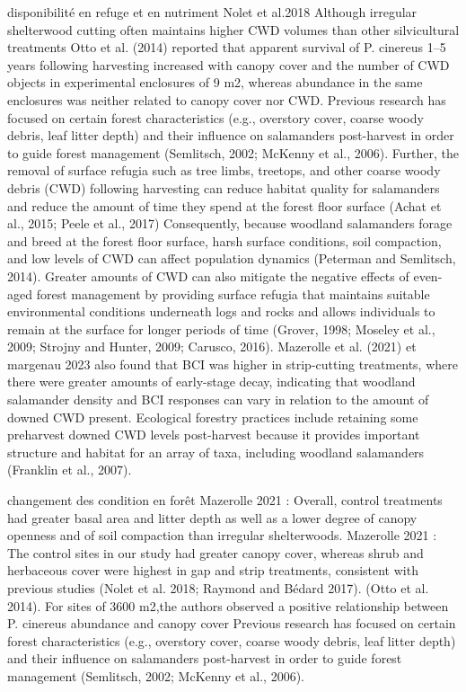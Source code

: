 disponibilité en refuge et en nutriment
Nolet et al.2018 Although irregular shelterwood cutting often maintains higher CWD volumes than other silvicultural treatments 
Otto et al. (2014) reported that apparent survival of P. cinereus 1–5 years following harvesting increased with canopy cover and the number of CWD objects in experimental enclosures of 9 m2, whereas abundance in the same enclosures was neither related to canopy cover nor CWD. 
Previous research has focused on certain forest characteristics (e.g., overstory cover, coarse woody debris, leaf litter depth) and their influence on salamanders post-harvest in order to guide forest management (Semlitsch, 2002; McKenny et al., 2006).
Further, the removal of surface refugia such as tree limbs, treetops, and other coarse woody debris (CWD) following harvesting can reduce habitat quality for salamanders and reduce the amount of time they spend at the forest floor surface (Achat et al., 2015; Peele et al., 2017)
Consequently, because woodland salamanders forage and breed at the forest floor surface, harsh surface conditions, soil compaction, and low levels of CWD can affect population dynamics (Peterman and Semlitsch, 2014).
Greater amounts of CWD can also mitigate the negative effects of even-aged forest management by providing surface refugia that maintains suitable environmental conditions underneath logs and rocks and allows individuals to remain at the surface for longer periods of time (Grover, 1998; Moseley et al., 2009; Strojny and Hunter, 2009; Carusco, 2016).
Mazerolle et al. (2021)  et margenau 2023 also found that BCI was higher in strip-cutting treatments, where there were greater amounts of early-stage decay, indicating that woodland salamander density and BCI responses can vary in relation to the amount of downed CWD present.
Ecological forestry practices include retaining some preharvest downed CWD levels post-harvest because it provides important structure and habitat for an array of taxa, including woodland salamanders (Franklin et al., 2007).

changement des condition en forêt
Mazerolle 2021 : Overall, control treatments had greater basal area and litter depth as well as a lower degree of canopy openness and of soil compaction than irregular shelterwoods.
Mazerolle 2021 : The control sites in our study had greater canopy cover, whereas shrub and herbaceous cover were highest in gap and strip treatments, consistent with previous studies (Nolet et al. 2018; Raymond and Bédard 2017).
(Otto et al. 2014). For sites of 3600 m2,the authors observed a positive relationship between P. cinereus abundance and canopy cover 
Previous research has focused on certain forest characteristics (e.g., overstory cover, coarse woody debris, leaf litter depth) and their influence on salamanders post-harvest in order to guide forest management (Semlitsch, 2002; McKenny et al., 2006).

